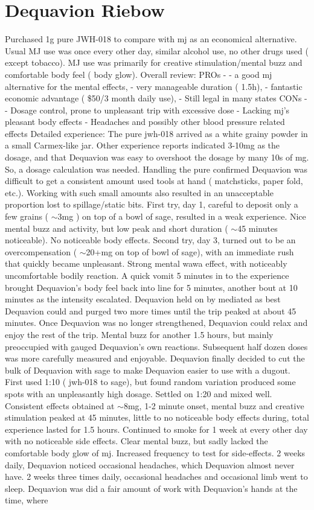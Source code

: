 \documentclass[12pt]{book}
\begin{document}
\chapter{Dequavion Riebow}

Purchased 1g pure JWH-018 to compare with mj as an economical alternative. Usual MJ use was once every other day, similar alcohol use, no other drugs used ( except tobacco). MJ use was primarily for creative stimulation/mental buzz and comfortable body feel ( body glow). Overall review: PROs - - a good mj alternative for the mental effects, - very manageable duration ( 1.5h), - fantastic economic advantage ( \$50/3 month daily use), - Still legal in many states CONs - - Dosage control, prone to unpleasant trip with excessive dose - Lacking mj's pleasant body effects - Headaches and possibly other blood pressure related effects Detailed experience: The pure jwh-018 arrived as a white grainy powder in a small Carmex-like jar. Other experience reports indicated 3-10mg as the dosage, and that Dequavion was easy to overshoot the dosage by many 10s of mg. So, a dosage calculation was needed. Handling the pure confirmed Dequavion was difficult to get a consistent amount used tools at hand ( matchsticks, paper fold, etc.). Working with such small amounts also resulted in an unacceptable proportion lost to spillage/static bits. First try, day 1, careful to deposit only a few grains ( $\sim$3mg ) on top of a bowl of sage, resulted in a weak experience. Nice mental buzz and activity, but low peak and short duration ( $\sim$45 minutes noticeable). No noticeable body effects. Second try, day 3, turned out to be an overcompensation ( $\sim$20+mg on top of bowl of sage), with an immediate rush that quickly became unpleasant. Strong mental wawa effect, with noticeably uncomfortable bodily reaction. A quick vomit 5 minutes in to the experience brought Dequavion's body feel back into line for 5 minutes, another bout at 10 minutes as the intensity escalated. Dequavion held on by mediated as best Dequavion could and purged two more times until the trip peaked at about 45 minutes. Once Dequavion was no longer strengthened, Dequavion could relax and enjoy the rest of the trip. Mental buzz for another 1.5 hours, but mainly preoccupied with gauged Dequavion's own reactions. Subsequent half dozen doses was more carefully measured and enjoyable. Dequavion finally decided to cut the bulk of Dequavion with sage to make Dequavion easier to use with a dugout. First used 1:10 ( jwh-018 to sage), but found random variation produced some spots with an unpleasantly high dosage. Settled on 1:20 and mixed well. Consistent effects obtained at $\sim$8mg, 1-2 minute onset, mental buzz and creative stimulation peaked at 45 minutes, little to no noticeable body effects during, total experience lasted for 1.5 hours. Continued to smoke for 1 week at every other day with no noticeable side effects. Clear mental buzz, but sadly lacked the comfortable body glow of mj. Increased frequency to test for side-effects. 2 weeks daily, Dequavion noticed occasional headaches, which Dequavion almost never have. 2 weeks three times daily, occasional headaches and occasional limb went to sleep. Dequavion was did a fair amount of work with Dequavion's hands at the time, where 
\end{document}
